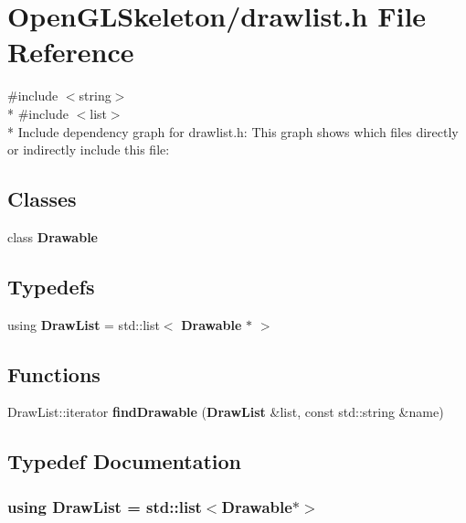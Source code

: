 \section{Open\+G\+L\+Skeleton/drawlist.h File Reference}
\label{drawlist_8h}
{\ttfamily \#include $<$string$>$}\\*
{\ttfamily \#include $<$list$>$}\\*
Include dependency graph for drawlist.\+h\+:
This graph shows which files directly or indirectly include this file\+:
\subsection*{Classes}
\begin{DoxyCompactItemize}
\item 
class {\bf Drawable}
\end{DoxyCompactItemize}
\subsection*{Typedefs}
\begin{DoxyCompactItemize}
\item 
using {\bf Draw\+List} = std\+::list$<$ {\bf Drawable} $\ast$ $>$
\end{DoxyCompactItemize}
\subsection*{Functions}
\begin{DoxyCompactItemize}
\item 
Draw\+List\+::iterator {\bf find\+Drawable} ({\bf Draw\+List} \&list, const std\+::string \&name)
\end{DoxyCompactItemize}


\subsection{Typedef Documentation}
\subsubsection[{Draw\+List}]{\setlength{\rightskip}{0pt plus 5cm}using {\bf Draw\+List} =  std\+::list$<${\bf Drawable}$\ast$$>$}\label{drawlist_8h_a4dd7049762619e3d87a40c5305bbbfb2}


